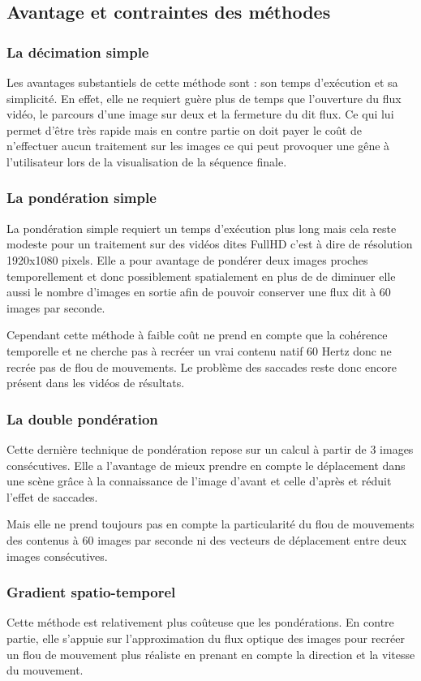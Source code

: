 \documentclass[fleqn,10pt]{SelfArx} %
\begin{document}
\subsection{Avantage et contraintes des méthodes}
\subsubsection{La décimation simple}
Les avantages substantiels de cette méthode sont : son temps d'exécution et sa simplicité. En effet, elle ne requiert guère plus de temps que l'ouverture du flux vidéo, le parcours d'une image sur deux et la fermeture du dit flux. Ce qui lui permet d'être très rapide mais en contre partie on doit payer le coût de n'effectuer aucun traitement sur les images ce qui peut provoquer une gêne à l'utilisateur lors de la visualisation de la séquence finale.

\subsubsection{La pondération simple}
La pondération simple requiert un temps d'exécution plus long mais cela reste modeste pour un traitement sur des vidéos dites \og FullHD \fg{} c'est à dire de résolution 1920x1080 pixels. Elle a pour avantage de pondérer deux images proches temporellement et donc possiblement spatialement en plus de de diminuer elle aussi le nombre d'images en sortie afin de pouvoir conserver une flux dit à 60 images par seconde.

Cependant cette méthode à faible coût ne prend en compte que la cohérence temporelle et ne cherche pas à recréer un vrai contenu natif 60 Hertz donc ne recrée pas de flou de mouvements. Le problème des saccades reste donc encore présent dans les vidéos de résultats.

\subsubsection{La double pondération}
Cette dernière technique de pondération repose sur un calcul à partir de 3 images consécutives. Elle a l'avantage de mieux prendre en compte le déplacement dans une scène grâce à la connaissance de l'image d'avant et celle d'après et réduit l'effet de saccades.

Mais elle ne prend toujours pas en compte la particularité du flou de mouvements des contenus à 60 images par seconde ni des vecteurs de déplacement entre deux images consécutives.

\subsubsection{Gradient spatio-temporel}
Cette méthode est relativement plus coûteuse que les pondérations. En contre partie, elle s'appuie sur
l'approximation du flux optique des images pour recréer un flou de mouvement plus réaliste en prenant en
compte la direction et la vitesse du mouvement.
\end{document}
